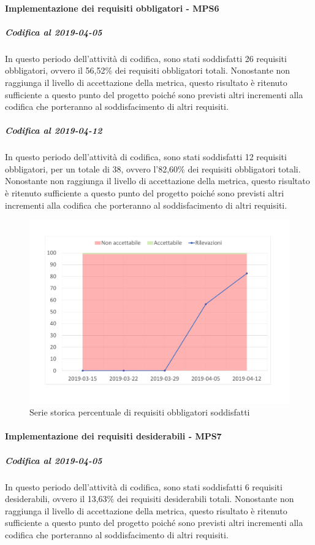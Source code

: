 \paragraph{Implementazione dei requisiti obbligatori - MPS6}
\subparagraph{Codifica al 2019-04-05}
In questo periodo dell'attività di codifica, sono stati soddisfatti 26 requisiti obbligatori, ovvero il 56,52\% dei requisiti obbligatori totali.
Nonostante non raggiunga il livello di accettazione della
metrica, questo risultato è ritenuto sufficiente a questo punto del progetto poiché sono previsti altri incrementi alla codifica che porteranno al soddisfacimento di altri requisiti.

\subparagraph{Codifica al 2019-04-12}
In questo periodo dell'attività di codifica, sono stati soddisfatti 12 requisiti obbligatori, per un totale di 38, ovvero l'82,60\% dei requisiti obbligatori totali.
Nonostante non raggiunga il livello di accettazione della
metrica, questo risultato è ritenuto sufficiente a questo punto del progetto poiché sono previsti altri incrementi alla codifica che porteranno al soddisfacimento di altri requisiti.
\begin{figure}[H]
	\centering
	\includegraphics[scale=0.6]{images/resoconto/MPS6Chart.pdf}
	\caption{Serie storica percentuale di requisiti obbligatori soddisfatti}	
\end{figure}

\paragraph{Implementazione dei requisiti desiderabili - MPS7}
\subparagraph{Codifica al 2019-04-05}
In questo periodo dell'attività di codifica, sono stati soddisfatti 6 requisiti desiderabili, ovvero il 13,63\% dei requisiti desiderabili totali.
Nonostante non raggiunga il livello di accettazione della
metrica, questo risultato è ritenuto sufficiente a questo punto del progetto poiché sono previsti altri incrementi alla codifica che porteranno al soddisfacimento di altri requisiti.

